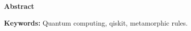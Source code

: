 \newpage

\thispagestyle{empty}

\begin{center}

{\bf \Huge Abstract}

  \end{center}
\vspace{1cm}

\vspace{2cm}

\textbf{Keywords:} Quantum computing, qiskit, metamorphic rules.